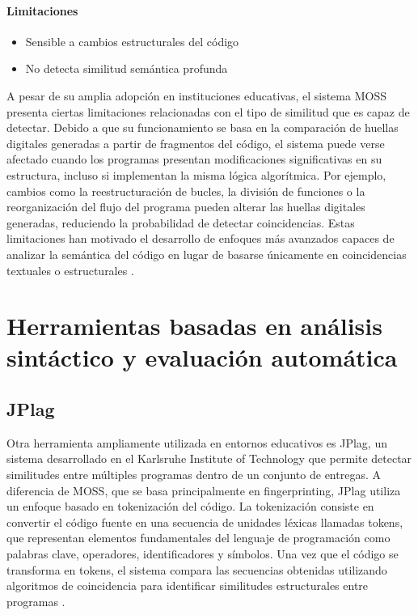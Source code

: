\paragraph{Limitaciones}
\begin{itemize}
    \item Sensible a cambios estructurales del código
    \item No detecta similitud semántica profunda
\end{itemize}

A pesar de su amplia adopción en instituciones educativas, el sistema MOSS presenta ciertas limitaciones relacionadas con el tipo de similitud que es capaz de detectar. Debido a que su funcionamiento se basa en la comparación de huellas digitales generadas a partir de fragmentos del código, el sistema puede verse afectado cuando los programas presentan modificaciones significativas en su estructura, incluso si implementan la misma lógica algorítmica. Por ejemplo, cambios como la reestructuración de bucles, la división de funciones o la reorganización del flujo del programa pueden alterar las huellas digitales generadas, reduciendo la probabilidad de detectar coincidencias. Estas limitaciones han motivado el desarrollo de enfoques más avanzados capaces de analizar la semántica del código en lugar de basarse únicamente en coincidencias textuales o estructurales \cite{Hovemeyer2019Gradescope}.

\section{Herramientas basadas en análisis sintáctico y evaluación automática}

\subsection{JPlag}

Otra herramienta ampliamente utilizada en entornos educativos es JPlag, un sistema desarrollado en el Karlsruhe Institute of Technology que permite detectar similitudes entre múltiples programas dentro de un conjunto de entregas. A diferencia de MOSS, que se basa principalmente en fingerprinting, JPlag utiliza un enfoque basado en tokenización del código. La tokenización consiste en convertir el código fuente en una secuencia de unidades léxicas llamadas tokens, que representan elementos fundamentales del lenguaje de programación como palabras clave, operadores, identificadores y símbolos. Una vez que el código se transforma en tokens, el sistema compara las secuencias obtenidas utilizando algoritmos de coincidencia para identificar similitudes estructurales entre programas \cite{PrecheltJPlag}.


